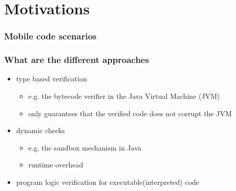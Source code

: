 \documentclass{beamer}
\begin{document}
\section{Motivations}


\begin{frame}
\frametitle{Mobile code scenarios}
\begin{figure}[ht!]
\begin{center}
\end{center}
\end{figure} 
\end{frame}


\begin{frame}
 \frametitle{What are the different approaches}
 \begin{itemize}
   \item type based verification  
        \begin{itemize}
               \item e.g. the bytecode verifier in the Java Virtual Machine (JVM) 
               \item only guarantees that the verified code does not corrupt  the JVM 
         \end{itemize}
   \item dynamic checks 
        \begin{itemize} 
                \item e.g. the sandbox mechanism in Java  %
		\item runtime overhead  
        \end{itemize}
    \item program logic  verification for executable(interpreted) code 
 \end{itemize}
\end{frame}
\end{document}

